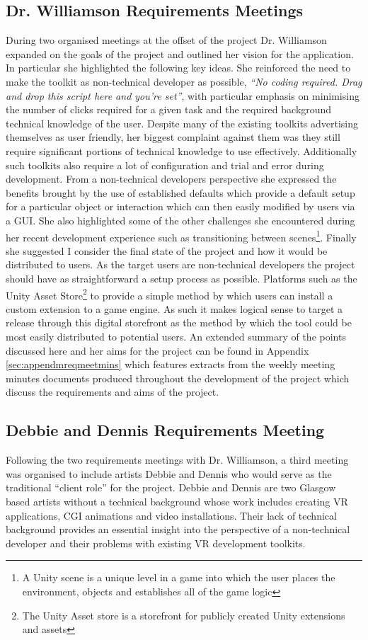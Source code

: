 \documentclass{l4proj}
\begin{document}
\subsection{Dr. Williamson Requirements Meetings}
\label{sec:requirementsdrwilliamson}
During two organised meetings at the offset of the project Dr. Williamson expanded on the goals of the project and outlined her vision for the application. In particular she highlighted the following key ideas. She reinforced the need to make the toolkit as non-technical developer as possible, \textit{``No coding required. Drag and drop this script here and you're set''}, with particular emphasis on minimising the number of clicks required for a given task and the required background technical knowledge of the user. Despite many of the existing toolkits advertising themselves as user friendly, her biggest complaint against them was they still require significant portions of technical knowledge to use effectively. Additionally such toolkits also require a lot of configuration and trial and error during development. From a non-technical developers perspective she expressed the benefits brought by the use of established defaults which provide a default setup for a particular object or interaction which can then easily modified by users via a GUI. She also highlighted some of the other challenges she encountered during her recent development experience such as transitioning between scenes\footnote{A Unity scene is a unique level in a game into which the user places the environment, objects and establishes all of the game logic}. Finally she suggested I consider the final state of the project and how it would be distributed to users. As the target users are non-technical developers the project should have as straightforward a setup process as possible. Platforms such as the Unity Asset Store\footnote{The Unity Asset store is a storefront for publicly created Unity extensions and assets} to provide a simple method by which users can install a custom extension to a game engine. As such it makes logical sense to target a release through this digital storefront as the method by which the tool could be most easily distributed to potential users. An extended summary of the points discussed here and her aims for the project can be found in Appendix \ref{sec:appendmreqmeetmins} which features extracts from the weekly meeting minutes documents produced throughout the development of the project which discuss the requirements and aims of the project.

\subsection{Debbie and Dennis Requirements Meeting}
\label{sec:requirementsdndmeeting}
Following the two requirements meetings with Dr. Williamson, a third meeting was organised to include artists Debbie and Dennis who would serve as the traditional ``client role'' for the project. Debbie and Dennis are two Glasgow based artists without a technical background whose work includes creating VR applications, CGI animations and video installations. Their lack of technical background provides an essential insight into the perspective of a non-technical developer and their problems with existing VR development toolkits.
\end{document}
